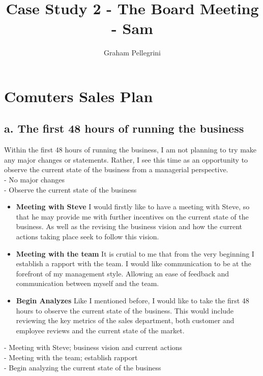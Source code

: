 \documentclass{article}
\title{Case Study 2 - The Board Meeting - Sam}
\author{Graham Pellegrini}
\date{}
\begin{document}
\maketitle

\section{Comuters Sales Plan}
\subsection{a. The first 48 hours of running the business}
Within the first 48 hours of running the business, I am not planning to try make any major changes or statements. Rather, I see this time as an opportunity to observe the current state of the business from a managerial perspective. \\
- No major changes \\
- Observe the current state of the business \\

\begin{itemize}
    \item \textbf{Meeting with Steve} I would firstly like to have a meeting with Steve, so that he may provide me with further incentives on the current state of the business. As well as the revising the business vision and how the current actions taking place seek to follow this vision. \\
    \item \textbf{Meeting with the team} It is crutial to me that from the very beginning I establish a rapport with the team. I would like communication to be at the forefront of my management style. Allowing an ease of feedback and communication between myself and the team. \\
    \item \textbf{Begin Analyzes} Like I mentioned before, I would like to take the first 48 hours to observe the current state of the business. This would include reviewing the key metrics of the sales department, both customer and employee reviews and the current state of the market. \\
\end{itemize}
- Meeting with Steve; business vision and current actions \\
- Meeting with the team; establish rapport \\
- Begin analyzing the current state of the business \\
\end{document}
